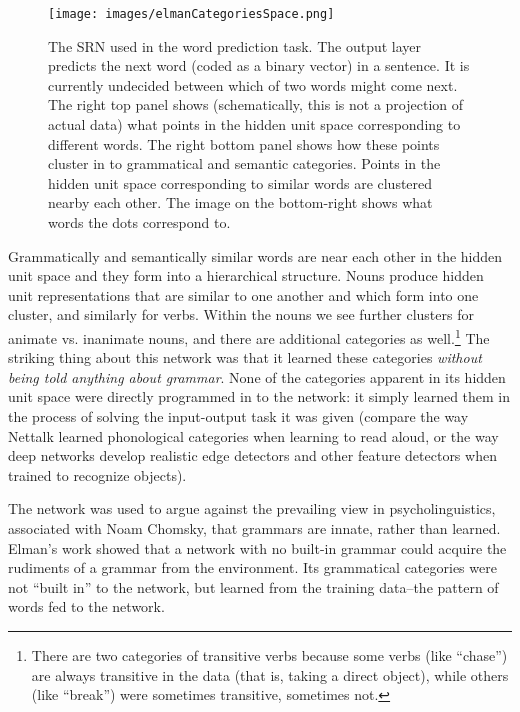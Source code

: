 \begin{figure}[h]
\centering
\texttt{[image: images/elmanCategoriesSpace.png]}
\caption[Jeff Yoshimi.]{The SRN used in the word prediction task. The output layer predicts the next word (coded as a binary vector) in a sentence. It is currently undecided between which of two words might come next. The right top panel shows (schematically, this is not a projection of actual data) what points in the hidden unit space corresponding to different words. The right bottom panel shows how these points cluster in to grammatical and semantic categories. Points in the hidden unit space corresponding to similar words are clustered nearby each other. The image on the bottom-right shows what words the dots correspond to.}
\label{elman_srn_categories}
\end{figure}

Grammatically and semantically similar words are near each other in the hidden unit space and they form into a hierarchical structure. Nouns produce hidden unit representations that are similar to one another and which form into one cluster, and similarly for verbs. Within the nouns we see further clusters for animate vs. inanimate nouns, and there are additional categories as well.\footnote{There are two categories of transitive verbs because some verbs (like ``chase'') are always transitive in the data (that is, taking a direct object), while others (like ``break'') were sometimes transitive, sometimes not.}  The striking thing about this network was that it learned these categories \emph{without being told anything about grammar}. None of the categories apparent in its hidden unit space were directly programmed in to the network: it simply learned them in the process of solving the input-output task it was given (compare the way Nettalk learned phonological categories when learning to read aloud, or the way deep networks develop realistic edge detectors and other feature detectors when trained to recognize objects). 

The network was used to argue against the prevailing view in psycholinguistics, associated with Noam Chomsky, that  grammars are innate, rather than learned.  Elman's work showed that a network with no built-in grammar could acquire the rudiments of a grammar from the environment. Its grammatical categories were not ``built in'' to the network, but learned from the training data--the pattern of words fed to the network.

